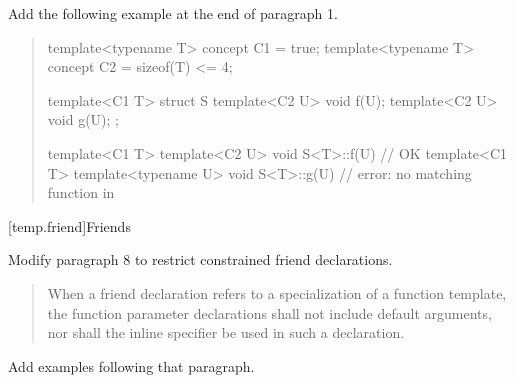 Add the following example at the end of paragraph 1.

\begin{quote}
\begin{addedblock}
\enterexample
\begin{codeblock}
template<typename T> concept C1 = true;
template<typename T> concept C2 = sizeof(T) <= 4;

template<C1 T>
  struct S {
    template<C2 U> void f(U);
    template<C2 U> void g(U);
  };

template<C1 T> template<C2 U> 
  void S<T>::f(U) { } // OK
template<C1 T> template<typename U> 
  void S<T>::g(U) { }                // error: no matching function in 
\end{codeblock}
\exitexample
\end{addedblock}
\end{quote}


[temp.friend]{Friends}

Modify paragraph 8 to restrict constrained friend declarations.

\begin{quote}
\setcounter{Paras}{7}
\pnum
When a friend declaration refers to a specialization of a function
template, the function parameter declarations shall not include
default arguments,  nor shall the inline specifier be used in such a
declaration.
\end{quote}

Add examples following that paragraph.

